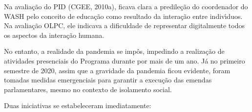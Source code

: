 \documentclass[
12pt,		%
openright,	%
twoside,  %
a4paper,			%
chapter=TITLE,		%
english,			%
french,				%
spanish,			%
brazil				%
]{USPSC-classe/USPSC}
\begin{document}
Na avalia\c{c}\~ao do PID (CGEE, 2010a), ficava clara a predile\c{c}\~ao do coordenador do WASH pelo conceito de educa\c{c}\~ao como resultado da intera\c{c}\~ao entre indiv\'{\i}duos. Na avalia\c{c}\~ao OLPC, ele indicava a dificuldade de representar digitalmente todos os aspectos da intera\c{c}\~ao humana.









No entanto, a realidade da pandemia se imp\^os, impedindo a realiza\c{c}\~ao de atividades presenciais do Programa durante por mais de um ano. J\'a no primeiro semestre de 2020, assim que a gravidade da pandemia ficou evidente, foram tomadas medidas emergenciais para garantir a execu\c{c}\~ao das emendas parlamentares, mesmo no contexto de isolamento social.









Duas iniciativas se estabeleceram imediatamente:
\end{document}
